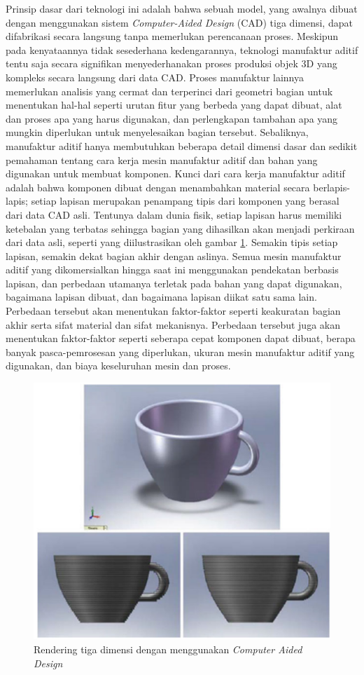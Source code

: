 Prinsip dasar dari teknologi ini adalah bahwa sebuah model, yang awalnya dibuat dengan menggunakan sistem \textit{Computer-Aided Design} (CAD) tiga dimensi, dapat difabrikasi secara langsung tanpa memerlukan perencanaan proses. Meskipun pada kenyataannya tidak sesederhana kedengarannya, teknologi manufaktur aditif tentu saja secara signifikan menyederhanakan proses produksi objek 3D yang kompleks secara langsung dari data CAD. Proses manufaktur lainnya memerlukan analisis yang cermat dan terperinci dari geometri bagian untuk menentukan hal-hal seperti urutan fitur yang berbeda yang dapat dibuat, alat dan proses apa yang harus digunakan, dan perlengkapan tambahan apa yang mungkin diperlukan untuk menyelesaikan bagian tersebut. Sebaliknya, manufaktur aditif hanya membutuhkan beberapa detail dimensi dasar dan sedikit pemahaman tentang cara kerja mesin manufaktur aditif dan bahan yang digunakan untuk membuat komponen. Kunci dari cara kerja manufaktur aditif adalah bahwa komponen dibuat dengan menambahkan material secara berlapis-lapis; setiap lapisan merupakan penampang tipis dari komponen yang berasal dari data CAD asli. Tentunya dalam dunia fisik, setiap lapisan harus memiliki ketebalan yang terbatas sehingga bagian yang dihasilkan akan menjadi perkiraan dari data asli, seperti yang diilustrasikan oleh gambar \ref{fig:cad}. Semakin tipis setiap lapisan, semakin dekat bagian akhir dengan aslinya. Semua mesin manufaktur aditif yang dikomersialkan hingga saat ini menggunakan pendekatan berbasis lapisan, dan perbedaan utamanya terletak pada bahan yang dapat digunakan, bagaimana lapisan dibuat, dan bagaimana lapisan diikat satu sama lain. Perbedaan tersebut akan menentukan faktor-faktor seperti keakuratan bagian akhir serta sifat material dan sifat mekanisnya. Perbedaan tersebut juga akan menentukan faktor-faktor seperti seberapa cepat komponen dapat dibuat, berapa banyak pasca-pemrosesan yang diperlukan, ukuran mesin manufaktur aditif yang digunakan, dan biaya keseluruhan mesin dan proses.

\begin{figure}[H]
    \centering
    \includegraphics[width=0.6\linewidth]{gambar/cad-image.png}
    \caption{Rendering tiga dimensi dengan menggunakan \textit{Computer Aided Design}}
    \label{fig:cad}
\end{figure}


